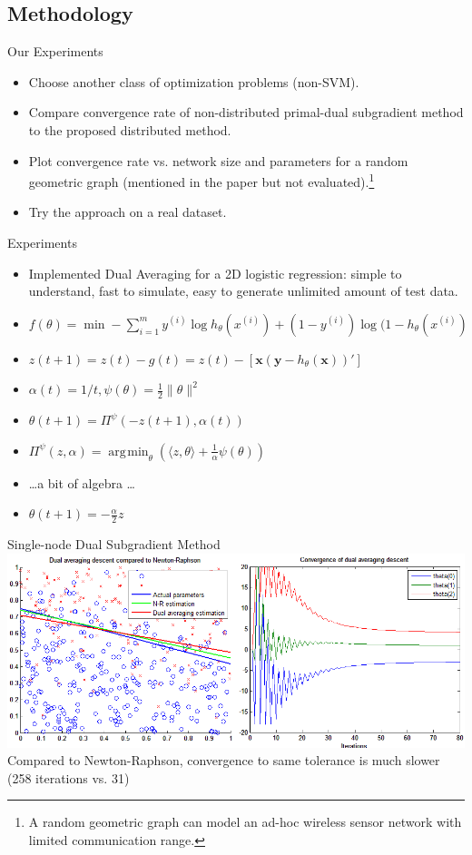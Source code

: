 \documentclass{beamer}
\DeclareMathOperator*{\argmin}{\arg\!\min}
\begin{document}
	\subsection{Methodology}
	\begin{frame}{Our Experiments}
		\begin{itemize}
			\item Choose another class of optimization problems (non-SVM).
			\item Compare convergence rate of non-distributed primal-dual subgradient method
				to the proposed distributed method.
			\item Plot convergence rate vs. network size and parameters for a random geometric
				graph (mentioned in the paper but not evaluated).\footnote{A random geometric
				graph can model an ad-hoc wireless sensor network with limited communication range.}
			\item Try the approach on a real dataset.				
		\end{itemize}
	\end{frame}
	
	\begin{frame}{Experiments}
		\begin{itemize}
			\item Implemented Dual Averaging for a 2D logistic regression: simple to understand,
				fast to simulate, easy to generate unlimited amount of test data.
			\item $f(\theta) = \min-\sum_{i=1}^{m} y^{(i)}\log h_\theta(x^{(i)}) + (1- y^{(i)})\log (1 - h_\theta(x^{(i)})$
			\item $z(t+1) = z(t) - g(t) = z(t) - [\mathbf{x}(\mathbf{y} - h_\theta(\mathbf{x}))']$
			\item $\alpha(t) = 1/t, \psi(\theta) = \frac{1}{2}\| \theta \|^2$
			\item $\theta(t+1) = \Pi^\psi(-z(t+1), \alpha(t))$
			\item $ \Pi^\psi(z, \alpha) = \argmin_{\theta}(\langle z, \theta \rangle + \frac{1}{\alpha}\psi(\theta))$
			\item \ldots a bit of algebra \ldots
			\item $\theta(t+1) = -\frac{\alpha}{2}z$			
		\end{itemize}
	\end{frame}	
	
	\begin{frame}{Single-node Dual Subgradient Method}
		 \includegraphics[width=\textwidth]{comp-vs-nr.png}\\
		 Compared to Newton-Raphson, convergence to same tolerance is much slower (258 iterations vs. 31)
	\end{frame}
	
\end{document}
